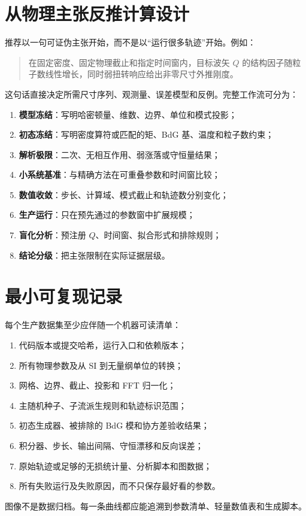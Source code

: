 \section{从物理主张反推计算设计}

推荐以一句可证伪主张开始，而不是以“运行很多轨迹”开始。例如：
\begin{quote}
在固定密度、固定物理截止和指定时间窗内，目标波矢 $Q$ 的结构因子随粒子数线性增长，同时弱扭转响应给出非零尺寸外推刚度。
\end{quote}
这句话直接决定所需尺寸序列、观测量、误差模型和反例。完整工作流可分为：
\begin{enumerate}
  \item \textbf{模型冻结}：写明哈密顿量、维数、边界、单位和模式投影；
  \item \textbf{初态冻结}：写明密度算符或匹配的矩、BdG 基、温度和粒子数约束；
  \item \textbf{解析极限}：二次、无相互作用、弱涨落或守恒量结果；
  \item \textbf{小系统基准}：与精确方法在可重叠参数和时间窗比较；
  \item \textbf{数值收敛}：步长、计算域、模式截止和轨迹数分别变化；
  \item \textbf{生产运行}：只在预先通过的参数窗中扩展规模；
  \item \textbf{盲化分析}：预注册 $Q$、时间窗、拟合形式和排除规则；
  \item \textbf{结论分级}：把主张限制在实际证据层级。
\end{enumerate}

\section{最小可复现记录}

每个生产数据集至少应伴随一个机器可读清单：
\begin{enumerate}
  \item 代码版本或提交哈希，运行入口和依赖版本；
  \item 所有物理参数及从 SI 到无量纲单位的转换；
  \item 网格、边界、截止、投影和 FFT 归一化；
  \item 主随机种子、子流派生规则和轨迹标识范围；
  \item 初态生成器、被排除的 BdG 模和协方差验收结果；
  \item 积分器、步长、输出间隔、守恒漂移和反向误差；
  \item 原始轨迹或足够的无损统计量、分析脚本和图数据；
  \item 所有失败运行及失败原因，而不只保存最好看的参数。
\end{enumerate}
图像不是数据归档。每一条曲线都应能追溯到参数清单、轻量数值表和生成脚本。

